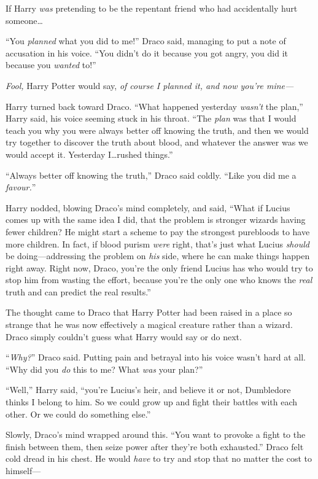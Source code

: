 If Harry \emph{was} pretending to be the repentant friend who had accidentally hurt someone…

“You \emph{planned} what you did to me!” Draco said, managing to put a note of accusation in his voice. “You didn’t do it because you got angry, you did it because you \emph{wanted} to!”

\emph{Fool,} Harry Potter would say, \emph{of course I planned it, and now you’re mine—}

Harry turned back toward Draco. “What happened yesterday \emph{wasn’t} the plan,” Harry said, his voice seeming stuck in his throat. “The \emph{plan} was that I would teach you why you were always better off knowing the truth, and then we would try together to discover the truth about blood, and whatever the answer was we would accept it. Yesterday I…rushed things.”

“Always better off knowing the truth,” Draco said coldly. “Like you did me a \emph{favour.}”

Harry nodded, blowing Draco’s mind completely, and said, “What if Lucius comes up with the same idea I did, that the problem is stronger wizards having fewer children? He might start a scheme to pay the strongest purebloods to have more children. In fact, if blood purism \emph{were} right, that’s just what Lucius \emph{should} be doing—addressing the problem on \emph{his} side, where he can make things happen right away. Right now, Draco, you’re the only friend Lucius has who would try to stop him from wasting the effort, because you’re the only one who knows the \emph{real} truth and can predict the real results.”

The thought came to Draco that Harry Potter had been raised in a place so strange that he was now effectively a magical creature rather than a wizard. Draco simply couldn’t guess what Harry would say or do next.

“\emph{Why?}” Draco said. Putting pain and betrayal into his voice wasn’t hard at all. “Why did you \emph{do} this to me? What \emph{was} your plan?”

“Well,” Harry said, “you’re Lucius’s heir, and believe it or not, Dumbledore thinks I belong to him. So we could grow up and fight their battles with each other. Or we could do something else.”

Slowly, Draco’s mind wrapped around this. “You want to provoke a fight to the finish between them, then seize power after they’re both exhausted.” Draco felt cold dread in his chest. He would \emph{have} to try and stop that no matter the cost to himself—


